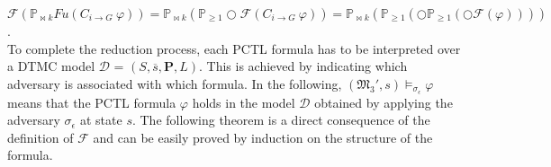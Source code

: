 $\mathscr{F}(\mathbb{P}_{\bowtie k} Fu(C_{i\rightarrow G} ~\varphi))= \mathbb{P}_{\bowtie k} (\mathbb{P}_{\geq 1}\bigcirc\mathscr{F}(C_{i\rightarrow G} ~\varphi))= \mathbb{P}_{\bowtie k}(\mathbb{P}_{\geq 1}(\bigcirc\mathbb{P}_{\geq 1}(\bigcirc \mathscr{F}(\varphi))))$.\\

To complete the reduction process, each PCTL formula has to be
interpreted over a DTMC model $\mathcal{D}$ =
$(S,\overline{s},\mathbf{P},L)$. This is achieved by indicating
which adversary is associated with which formula. In the
following, $(\mathfrak{M_3'},s)\models_{\sigma_\epsilon} \varphi$
means that the PCTL formula $\varphi$ holds in the model
$\mathcal{D}$ obtained by applying the adversary $\sigma_\epsilon$
at state $s$. The following theorem is a direct consequence of the
definition of $\mathscr{F}$ and can be easily proved by induction
on the structure of the formula.




